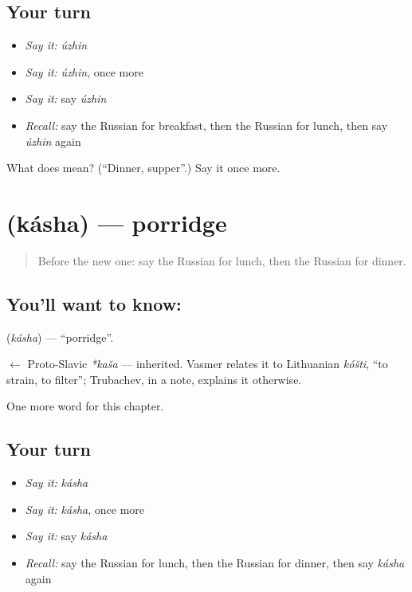 \subsection*{Your turn}
\begin{itemize}
\raggedright
  \item \emph{Say it:} \emph{úzhin}
  \item \emph{Say it:} \emph{úzhin}, once more
  \item \emph{Say it:} say \emph{úzhin}
  \item \emph{Recall:} say the Russian for breakfast, then the Russian for lunch, then say \emph{úzhin} again
\end{itemize}

\begin{tcolorbox}[breakable,colback=teal!4,colframe=teal!35!black,title={Before you move on}]
What does  mean? (\textquotedblleft{}Dinner, supper\textquotedblright{}.) Say it once more.
\end{tcolorbox}
\section[\texorpdfstring{\ru{каша} (kásha)}{каша (kásha)}]{ (kásha) — porridge}

\label{lesson:RU-C46-porridge}



\begin{quote}
Before the new one: say the Russian for lunch, then the Russian for dinner.
\end{quote}

\subsection*{You'll want to know: }
\textbf{} (\emph{kásha}) — \textquotedblleft{}porridge\textquotedblright{}.

\begin{cousinweb}
\textbf{} $\leftarrow$ Proto-Slavic \emph{*kaša} — inherited. Vasmer relates it to Lithuanian \emph{kóšti}, \textquotedblleft{}to strain, to filter\textquotedblright{}; Trubachev, in a note, explains it otherwise.
\end{cousinweb}

\begin{grammarlens}[title={What you've built}]
One more word for this chapter.
\end{grammarlens}

\subsection*{Your turn}
\begin{itemize}
\raggedright
  \item \emph{Say it:} \emph{kásha}
  \item \emph{Say it:} \emph{kásha}, once more
  \item \emph{Say it:} say \emph{kásha}
  \item \emph{Recall:} say the Russian for lunch, then the Russian for dinner, then say \emph{kásha} again
\end{itemize}

